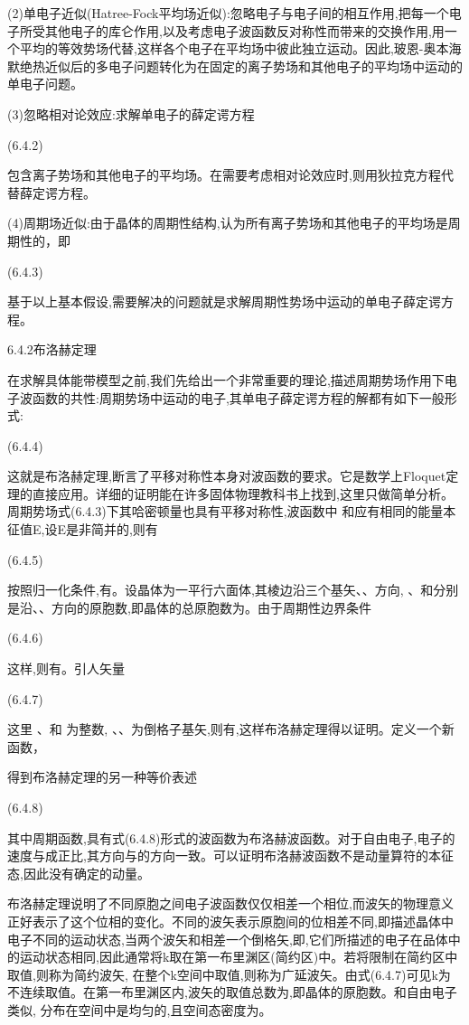 (2)单电子近似(Hatree-Fock平均场近似):忽略电子与电子间的相互作用,把每一个电子所受其他电子的库仑作用,以及考虑电子波函数反对称性而带来的交换作用,用一个平均的等效势场代替,这样各个电子在平均场中彼此独立运动。因此,玻恩-奥本海默绝热近似后的多电子问题转化为在固定的离子势场和其他电子的平均场中运动的单电子问题。

(3)忽略相对论效应:求解单电子的薛定谔方程

 	(6.4.2)

包含离子势场和其他电子的平均场。在需要考虑相对论效应时,则用狄拉克方程代替薛定谔方程。

(4)周期场近似:由于晶体的周期性结构,认为所有离子势场和其他电子的平均场是周期性的，即

 	(6.4.3)

基于以上基本假设,需要解决的问题就是求解周期性势场中运动的单电子薛定谔方程。

6.4.2布洛赫定理

在求解具体能带模型之前,我们先给出一个非常重要的理论,描述周期势场作用下电子波函数的共性:周期势场中运动的电子,其单电子薛定谔方程的解都有如下一般形式:

 	(6.4.4)

这就是布洛赫定理,断言了平移对称性本身对波函数的要求。它是数学上Floquet定理的直接应用。详细的证明能在许多固体物理教科书上找到,这里只做简单分析。周期势场式(6.4.3)下其哈密顿量也具有平移对称性,波函数中 和应有相同的能量本征值E,设E是非简并的,则有

 	(6.4.5)

按照归一化条件,有。设晶体为一平行六面体,其棱边沿三个基矢、、方向, 、和分别是沿、、方向的原胞数,即晶体的总原胞数为。由于周期性边界条件

	 (6.4.6)

这样,则有。引人矢量

 	(6.4.7)

这里 、和 为整数, 、、为倒格子基矢,则有,这样布洛赫定理得以证明。定义一个新函数，



得到布洛赫定理的另一种等价表述

 	(6.4.8)

其中周期函数,具有式(6.4.8)形式的波函数为布洛赫波函数。对于自由电子,电子的速度与成正比,其方向与的方向一致。可以证明布洛赫波函数不是动量算符的本征态,因此没有确定的动量。

布洛赫定理说明了不同原胞之间电子波函数仅仅相差一个相位,而波矢的物理意义正好表示了这个位相的变化。不同的波矢表示原胞间的位相差不同,即描述晶体中电子不同的运动状态,当两个波矢和相差一个倒格矢,即,它们所描述的电子在品体中的运动状态相同,因此通常将k取在第一布里渊区(简约区)中。若将限制在简约区中取值,则称为简约波矢, 在整个k空间中取值,则称为广延波矢。由式(6.4.7)可见k为不连续取值。在第一布里渊区内,波矢的取值总数为,即晶体的原胞数。和自由电子类似, 分布在空间中是均匀的,且空间态密度为。


